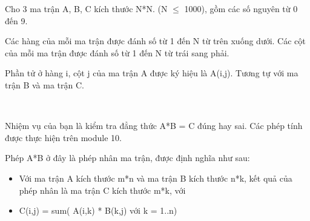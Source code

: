 Cho 3 ma trận A, B, C kích thước N*N. (N  $\le$  1000), gồm các số nguyên từ 0 đến 9.

Các hàng của mỗi ma trận được đánh số từ 1 đến N từ trên xuống dưới. Các cột của mỗi ma trận được đánh số từ 1 đến N từ trái sang phải.

Phần tử ở hàng i, cột j của ma trận A được ký hiệu là A(i,j). Tương tự với ma trận B và ma trận C.

 

Nhiệm vụ của bạn là kiểm tra đẳng thức A*B = C đúng hay sai. Các phép tính được thực hiện trên module 10.

Phép A*B ở đây là phép nhân ma trận, được định nghĩa như sau:
\begin{itemize}
	\item Với ma trận A kích thước m*n và ma trận B kích thước n*k, kết quả của phép nhân là ma trận C kích thước m*k, với
	\item C(i,j) = sum( A(i,k) * B(k,j) với k = 1..n)
\end{itemize}